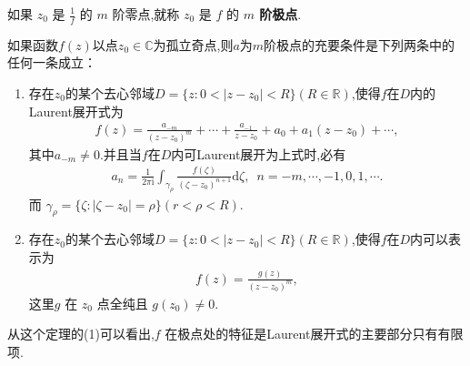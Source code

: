 \documentclass[../../main.tex]{subfiles}%
\begin{document}
\begin{definition}
如果 \( z_0 \) 是 \( \frac{1}{f} \) 的 \( m \) 阶零点,就称 \( z_0 \) 是 \( f \) 的 \textbf{\( m \) 阶极点}.
\end{definition}

\begin{theorem}\label{theorem:m阶极点的充要条件}
如果函数$f(z)$以点$z_0\in \mathbb{C}$为孤立奇点,则$a$为$m$阶极点的充要条件是下列两条中的任何一条成立：
\begin{enumerate}[(1)]
\item\label{theorem:m阶极点的充要条件-1} 存在$z_0$的某个去心邻域$D=\{z:0<|z-z_0|<R\}(R\in \mathbb{R})$,使得\( f \)在$D$内的Laurent展开式为
\begin{align}
f(z) = \frac{a_{-m}}{(z - z_0)^m} + \cdots + \frac{a_{-1}}{z - z_0} + a_0 + a_1(z - z_0) + \cdots, \label{eq---:::213907---2}
\end{align}
其中\( a_{-m} \neq 0 \).并且当\( f \)在$D$内可Laurent展开为上式时,必有
\begin{align*}
a_n=\frac{1}{2\pi \mathrm{i}}\int_{\gamma _{\rho}}{\frac{f(\zeta )}{(\zeta -z_0)^{n+1}}\mathrm{d}\zeta},\,\,\,n=-m,\cdots ,-1,0,1,\cdots .
\end{align*}
而 \( \gamma_{\rho} = \{ \zeta: |\zeta - z_0| = \rho \} \)\( (r < \rho < R )\).

\item\label{theorem:m阶极点的充要条件-2} 存在$z_0$的某个去心邻域$D=\{z:0<|z-z_0|<R\}(R\in \mathbb{R})$,使得\( f \)在$D$内可以表示为
\begin{align}\label{eq::0jn2fgj4gfj2-wof8n23}
f(z) = \frac{g(z)}{(z-z_0)^m},
\end{align}
这里\( g \) 在 \( z_0 \) 点全纯且 \( g(z_0) \neq 0 \).
\end{enumerate}
\end{theorem}
\begin{remark}
从这个定理的(1)可以看出,\( f \) 在极点处的特征是Laurent展开式的主要部分只有有限项.
\end{remark}
\end{document}
